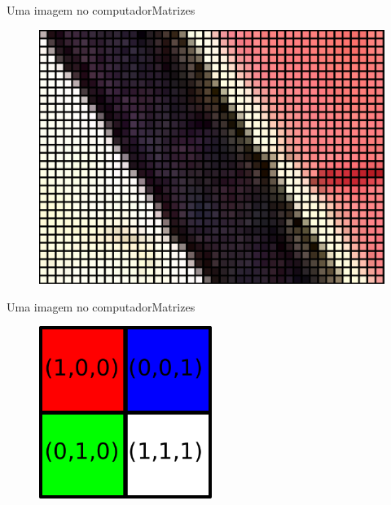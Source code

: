 \documentclass{beamer}
\begin{document}
\begin{frame}{Uma imagem no computador}{Matrizes}
    \begin{figure}
        \centering   
        \includegraphics[scale=0.2]{figs/maceio-zoom2.png}
    \end{figure}
\end{frame}

\begin{frame}{Uma imagem no computador}{Matrizes}
    \begin{figure}
        \centering   
        \includegraphics[width=0.5\textwidth]{figs/imagem-matriz.pdf}
    \end{figure}
\end{frame}
\end{document}
